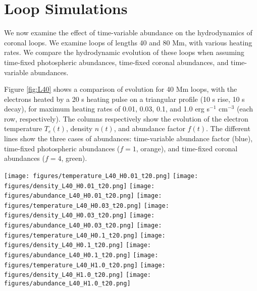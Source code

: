 \documentclass[twocolumn]{aastex631}
\begin{document}
\section{Loop Simulations}
We now examine the effect of time-variable abundance on the hydrodynamics of coronal loops.  We examine loops of lengths 40 and 80 Mm, with various heating rates.  We compare the hydrodynamic evolution of these loops when assuming time-fixed photospheric abundances, time-fixed coronal abundances, and time-variable abundances. 

Figure \ref{fig:L40} shows a comparison of evolution for 40 Mm loops, with the electrons heated by a 20 s heating pulse on a triangular profile (10 s rise, 10 s decay), for maximum heating rates of 0.01, 0.03, 0.1, and 1.0 erg s$^{-1}$ cm$^{-3}$ (each row, respectively).  The columns respectively show the evolution of the electron temperature $T_{e}(t)$, density $n(t)$, and abundance factor $f(t)$.  The different lines show the three cases of abundances: time-variable abundance factor (blue), time-fixed photospheric abundances ($f=1$, orange), and time-fixed coronal abundances ($f=4$, green).  
\begin{figure*}
    \begin{centering}
    \texttt{[image: figures/temperature\_L40\_H0.01\_t20.png]}
    \texttt{[image: figures/density\_L40\_H0.01\_t20.png]}
    \texttt{[image: figures/abundance\_L40\_H0.01\_t20.png]}
    \texttt{[image: figures/temperature\_L40\_H0.03\_t20.png]}
    \texttt{[image: figures/density\_L40\_H0.03\_t20.png]}
    \texttt{[image: figures/abundance\_L40\_H0.03\_t20.png]}    \texttt{[image: figures/temperature\_L40\_H0.1\_t20.png]}
    \texttt{[image: figures/density\_L40\_H0.1\_t20.png]}
    \texttt{[image: figures/abundance\_L40\_H0.1\_t20.png]}
    \texttt{[image: figures/temperature\_L40\_H1.0\_t20.png]}
    \texttt{[image: figures/density\_L40\_H1.0\_t20.png]}
    \texttt{[image: figures/abundance\_L40\_H1.0\_t20.png]}
    \caption{The evolution of the electron temperature (left column), density (center column), and abundance factor (right column) for a 40 Mm coronal loop, heated with 0.01, 0.03, 0.1, and 1.0 erg s$^{-1}$ cm$^{-3}$ (rows), for a 20 s heating pulse.  The blue lines show the case with time-variable abundances $f(t)$, while orange lines show time-fixed photospheric abundances ($f=1$), and green time-fixed coronal abundances ($f=4$). }
    \label{fig:L40}
    \end{centering}
\end{figure*}
\end{document}
